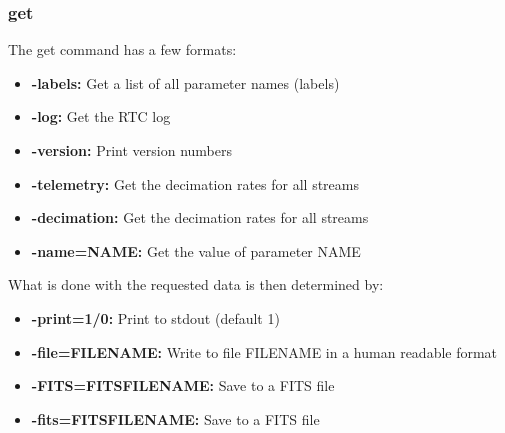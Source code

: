 \documentclass[a4,10pt]{article}
\begin{document}
{\subsubsection{get}
The get command has a few formats:
\begin{itemize}
\item {\bf -labels:} Get a list of all parameter names (labels)
\item {\bf -log:} Get the RTC log
\item {\bf -version:} Print version numbers
\item {\bf -telemetry:} Get the decimation rates for all streams
\item {\bf -decimation:} Get the decimation rates for all streams
\item {\bf -name=NAME:} Get the value of parameter NAME
\end{itemize}

What is done with the requested data is then determined by:
\begin{itemize}
\item {\bf -print=1/0:} Print to stdout (default 1)
\item {\bf -file=FILENAME:} Write to file FILENAME in a human readable
  format
\item {\bf -FITS=FITSFILENAME:} Save to a FITS file
\item {\bf -fits=FITSFILENAME:} Save to a FITS file
\end{itemize}

}
\end{document}
